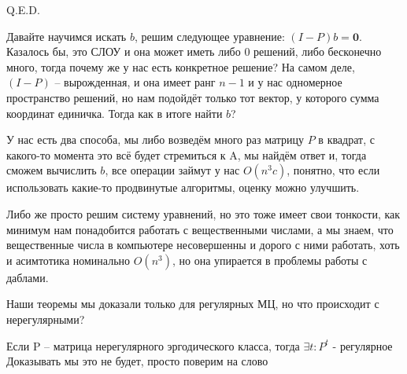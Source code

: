 \hfill Q.E.D.

Давайте научимся искать $b$, решим следующее уравнение: $(I - P)b = \mathbf{0}$. Казалось бы, это СЛОУ и она может иметь либо 0 решений, либо бесконечно много, тогда почему же у нас есть конкретное решение?
На самом деле, $(I-P)$ -- вырожденная, и она имеет ранг $n -1$ и у нас одномерное пространство решений, но нам подойдёт только тот вектор, у которого сумма координат единичка. Тогда как в итоге найти $b$?

У нас есть два способа, мы либо возведём много раз матрицу $P$ в квадрат, с какого-то момента это всё будет стремиться к A, мы найдём ответ и, тогда сможем вычислить $b$, все операции займут у нас $O(n^3c)$, понятно, что если использовать какие-то продвинутые алгоритмы, оценку можно улучшить.

Либо же просто решим систему уравнений, но это тоже имеет свои тонкости, как минимум нам понадобится работать с вещественными числами, а мы знаем, что вещественные числа в компьютере несовершенны и дорого с ними работать, хоть и асимтотика номинально $O(n^3)$, но она упирается в проблемы работы с даблами. 

Наши теоремы мы доказали только для регулярных МЦ, но что происходит с нерегулярными? 


    Если P -- матрица нерегулярного эргодического класса, тогда $\exists t : P^t$ - регулярное
    Доказывать мы это не будет, просто поверим на слово 







